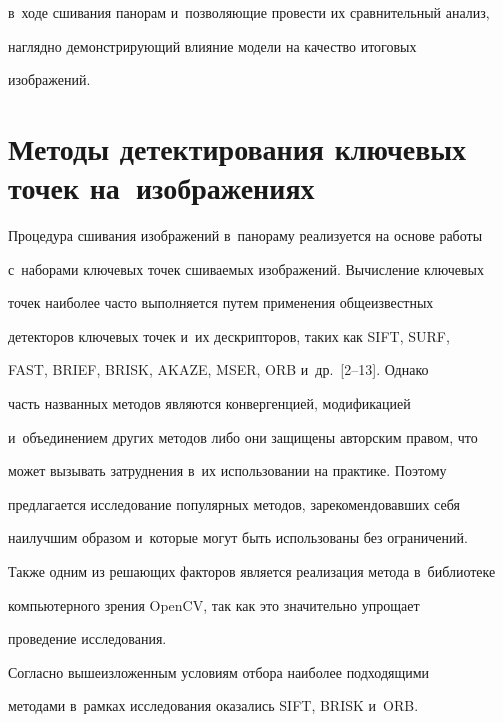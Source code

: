 в~ходе сшивания па\-но\-рам и~поз\-во\-ля\-ющие про\-вес\-ти их сравнительный анализ, 


на\-гляд\-но де\-мон\-ст\-ри\-ру\-ющий влияние модели на качество итоговых 


изоб\-ра\-жений.


{





}


  


  \section{Методы детектирования ключевых точек на~изображениях}


  


  Процедура сшивания изображений в~панораму реализуется на осно\-ве работы 


с~наборами ключевых точек сши\-ва\-емых изображений. Вы\-чис\-ле\-ние ключевых 


точек наиболее час\-то выполняется путем применения общеизвестных 


детекторов ключевых точек и~их дескрипторов, таких как SIFT, SURF, 


FAST, BRIEF, BRISK, AKAZE, MSER, ORB и~др.~[2--13]. Однако 


часть названных методов являются конвергенцией, модификацией 


и~объединением других методов либо они защищены авторским правом, что 


может вызывать за\-труд\-не\-ния в~их использовании на практике. Поэтому 


предлагается исследование популярных методов, зарекомендовавших себя 


наилучшим образом и~которые могут быть использованы без ограничений. 


Так\-же одним из ре\-ша\-ющих факторов является реализация метода в~биб\-лио\-те\-ке 


компьютерного зрения {OpenCV}, так как это значительно упрощает 


проведение исследования.


  


  Согласно вышеизложенным условиям отбора наиболее подходящими 


методами в~рамках исследования оказались SIFT, BRISK и~ORB. 


